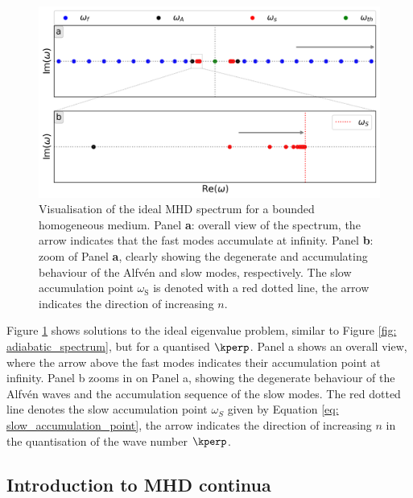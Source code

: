 \begin{figure}[t]
  \centering
  \includegraphics[width=\textwidth]{bounded_ideal_spectrum.png}
  \caption{
    Visualisation of the ideal MHD spectrum for a bounded homogeneous medium. Panel \textbf{a}: overall view of the spectrum, the arrow indicates that the fast modes accumulate at infinity.
    Panel \textbf{b}: zoom of Panel \textbf{a}, clearly showing the degenerate and accumulating behaviour of the Alfv\'en and slow modes, respectively. The slow accumulation point $\omega_\text{S}$ is denoted with a red dotted line, the arrow indicates the direction of increasing $n$.
  }
  \label{fig: bounded_spectrum}
\end{figure}

Figure \ref{fig: bounded_spectrum} shows solutions to the ideal eigenvalue problem, similar to Figure \ref{fig: adiabatic_spectrum}, but for a quantised $\kperp$. Panel a shows an overall view, where the arrow above the fast modes indicates their accumulation point at infinity. Panel b zooms in on Panel a, showing the degenerate behaviour of the Alfv\'en waves and the accumulation sequence of the slow modes. The red dotted line denotes the slow accumulation point $\omega_S$ given by Equation \eqref{eq: slow_accumulation_point}, the arrow indicates the direction of increasing $n$ in the quantisation of the wave number $\kperp$.

\subsection{Introduction to MHD continua} \label{ss: mhd_continua}

